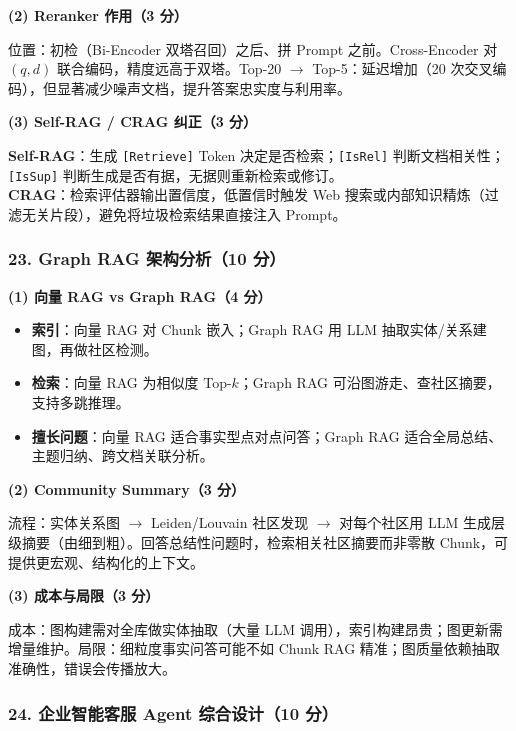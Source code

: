 \documentclass[11pt,a4paper]{article}
\begin{document}
\noindent\textbf{(2) Reranker 作用（3 分）}

位置：初检（Bi-Encoder 双塔召回）之后、拼 Prompt 之前。Cross-Encoder 对 $(q,d)$ 联合编码，精度远高于双塔。Top-20 $\to$ Top-5：延迟增加（20 次交叉编码），但显著减少噪声文档，提升答案忠实度与利用率。

\noindent\textbf{(3) Self-RAG / CRAG 纠正（3 分）}

\textbf{Self-RAG}：生成 \texttt{[Retrieve]} Token 决定是否检索；\texttt{[IsRel]} 判断文档相关性；\texttt{[IsSup]} 判断生成是否有据，无据则重新检索或修订。\\
\textbf{CRAG}：检索评估器输出置信度，低置信时触发 Web 搜索或内部知识精炼（过滤无关片段），避免将垃圾检索结果直接注入 Prompt。

\subsubsection*{23. Graph RAG 架构分析（10 分）}

\noindent\textbf{(1) 向量 RAG vs Graph RAG（4 分）}

\begin{itemize}[leftmargin=2em,itemsep=0pt,parsep=0pt,topsep=0pt]
  \item \textbf{索引}：向量 RAG 对 Chunk 嵌入；Graph RAG 用 LLM 抽取实体/关系建图，再做社区检测。
  \item \textbf{检索}：向量 RAG 为相似度 Top-$k$；Graph RAG 可沿图游走、查社区摘要，支持多跳推理。
  \item \textbf{擅长问题}：向量 RAG 适合事实型点对点问答；Graph RAG 适合全局总结、主题归纳、跨文档关联分析。
\end{itemize}

\noindent\textbf{(2) Community Summary（3 分）}

流程：实体关系图 $\to$ Leiden/Louvain 社区发现 $\to$ 对每个社区用 LLM 生成层级摘要（由细到粗）。回答总结性问题时，检索相关社区摘要而非零散 Chunk，可提供更宏观、结构化的上下文。

\noindent\textbf{(3) 成本与局限（3 分）}

成本：图构建需对全库做实体抽取（大量 LLM 调用），索引构建昂贵；图更新需增量维护。局限：细粒度事实问答可能不如 Chunk RAG 精准；图质量依赖抽取准确性，错误会传播放大。

\subsubsection*{24. 企业智能客服 Agent 综合设计（10 分）}
\end{document}
